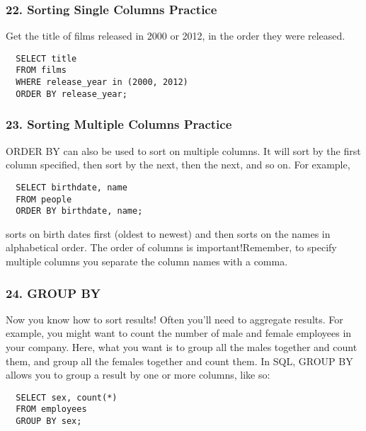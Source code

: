 \documentclass[
]{article}
\begin{document}
\hypertarget{sorting-single-columns-practice}{%
\subsubsection{22. Sorting Single Columns
Practice}\label{sorting-single-columns-practice}}

Get the title of films released in 2000 or 2012, in the order they were
released.

\begin{verbatim}
  SELECT title
  FROM films
  WHERE release_year in (2000, 2012)
  ORDER BY release_year;
\end{verbatim}

\hypertarget{sorting-multiple-columns-practice}{%
\subsubsection{23. Sorting Multiple Columns
Practice}\label{sorting-multiple-columns-practice}}

ORDER BY can also be used to sort on multiple columns. It will sort by
the first column specified, then sort by the next, then the next, and so
on. For example,

\begin{verbatim}
  SELECT birthdate, name
  FROM people
  ORDER BY birthdate, name;
\end{verbatim}

sorts on birth dates first (oldest to newest) and then sorts on the
names in alphabetical order. The order of columns is important!Remember,
to specify multiple columns you separate the column names with a comma.

\hypertarget{group-by}{%
\subsubsection{24. GROUP BY}\label{group-by}}

Now you know how to sort results! Often you'll need to aggregate
results. For example, you might want to count the number of male and
female employees in your company. Here, what you want is to group all
the males together and count them, and group all the females together
and count them. In SQL, GROUP BY allows you to group a result by one or
more columns, like so:

\begin{verbatim}
  SELECT sex, count(*)
  FROM employees
  GROUP BY sex;
\end{verbatim}
\end{document}
